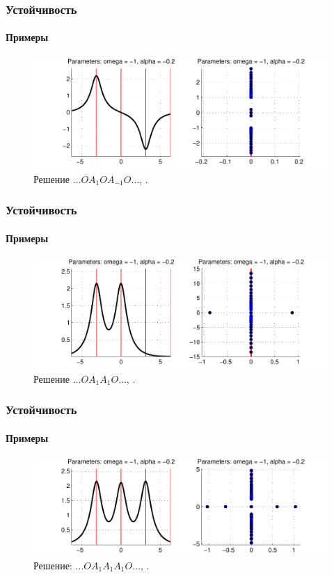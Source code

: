 \documentclass [10pt] {beamer}
\begin{document}
\begin{frame}
	\frametitle{Устойчивость}
	\framesubtitle{Примеры}
	
	\begin{figure}
		\includegraphics[width=1\textwidth]{pic/example_4.pdf}
		\caption{Решение $\dots O A_1 O A_{-1} O \dots$, {\it \color{forestgreen}{линейно устойчиво}}.}
		\label{pic:example_4}
	\end{figure}
\end{frame}

\begin{frame}
	\frametitle{Устойчивость}
	\framesubtitle{Примеры}
	
	\begin{figure}
		\includegraphics[width=1\textwidth]{pic/example_5.pdf}
		\caption{Решение $\dots O A_1 A_1 O \dots$, {\it \color{fireenginered}{экспоненциально неустойчиво}}.}
		\label{pic:example_5}
	\end{figure}
\end{frame}

\begin{frame}
	\frametitle{Устойчивость}
	\framesubtitle{Примеры}
	
	\begin{figure}
		\includegraphics[width=1\textwidth]{pic/example_6.pdf}
		\caption{Решение: $\dots O A_1 A_1 A_1 O \dots$, {\it \color{fireenginered}{экспоненциально неустойчиво}}.}
		\label{pic:example_6}
	\end{figure}
\end{frame}
\end{document}
